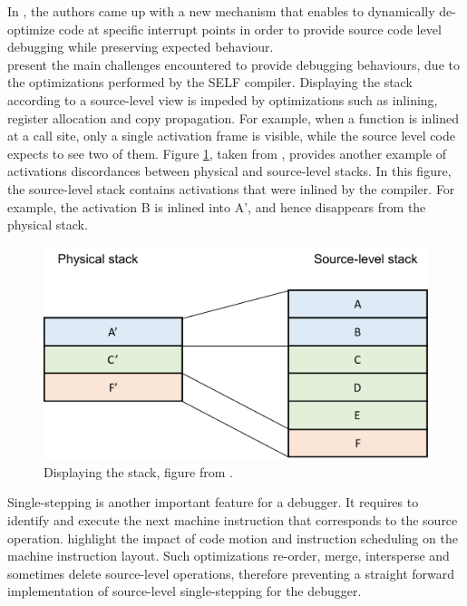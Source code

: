 In \cite{holzle1992debugging}, the authors came up with a new mechanism that enables to dynamically de-optimize code at specific interrupt points in order to provide source code level debugging while preserving expected behaviour.\\

 present the main challenges encountered to provide debugging behaviours, due to the optimizations performed by the SELF compiler. 
Displaying the stack according to a source-level view is impeded by optimizations such as inlining, register allocation and copy propagation.
For example, when a function is inlined at a call site, only a single activation frame is visible, while the source level code expects to see two of them.
Figure \ref{stackframes}, taken from \cite{holzle1992debugging}, provides another example of activations discordances between physical and source-level stacks.
In this figure, the source-level stack contains activations that were inlined by the compiler. For example, the activation B is inlined into A', and hence disappears from the physical stack.\\
\begin{figure}[h]
\centering
\includegraphics[scale=0.5]{Figures/Figure1}
\decoRule
\caption[physical vs. source-level stacks]{Displaying the stack, figure from \cite{holzle1992debugging}.}
\label{stackframes}
\end{figure}

Single-stepping is another important feature for a debugger. 
It requires to identify and execute the next machine instruction that corresponds to the source operation.
 highlight the impact of code motion and instruction scheduling on the machine instruction layout. 
Such optimizations re-order, merge, intersperse and sometimes delete source-level operations, therefore preventing a straight forward implementation of source-level single-stepping for the debugger.\\

